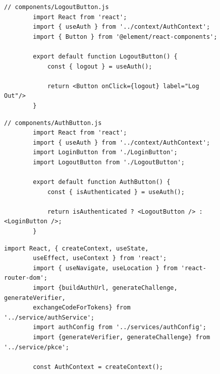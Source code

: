 \begin{figure}[H]
    \begin{lstlisting}[caption=JS-Code for the LogOut-Button, breaklines = true, label=list:logoutbutton]
        // components/LogoutButton.js
        import React from 'react';
        import { useAuth } from '../context/AuthContext';
        import { Button } from '@element/react-components';

        export default function LogoutButton() {
            const { logout } = useAuth();

            return <Button onClick={logout} label="Log Out"/>
        }
    \end{lstlisting}
\end{figure}

\begin{figure}[H]
    \begin{lstlisting}[caption=JS-Code for the AuthButton, breaklines = true, label=list:authbutton]
        // components/AuthButton.js
        import React from 'react';
        import { useAuth } from '../context/AuthContext';
        import LoginButton from './LoginButton';
        import LogoutButton from './LogoutButton';

        export default function AuthButton() {
            const { isAuthenticated } = useAuth();

            return isAuthenticated ? <LogoutButton /> : <LoginButton />;
        }
    \end{lstlisting}
\end{figure}

\begin{figure}[H]
    \begin{lstlisting}[caption=Import und Kontext, breaklines = true, label=list:authcontextimports]
        import React, { createContext, useState, 
        useEffect, useContext } from 'react';
        import { useNavigate, useLocation } from 'react-router-dom';
        import {buildAuthUrl, generateChallenge, generateVerifier, 
        exchangeCodeForTokens} from '../service/authService';
        import authConfig from '../services/authConfig';
        import {generateVerifier, generateChallenge} from '../service/pkce';

        const AuthContext = createContext();
    \end{lstlisting}
\end{figure}

